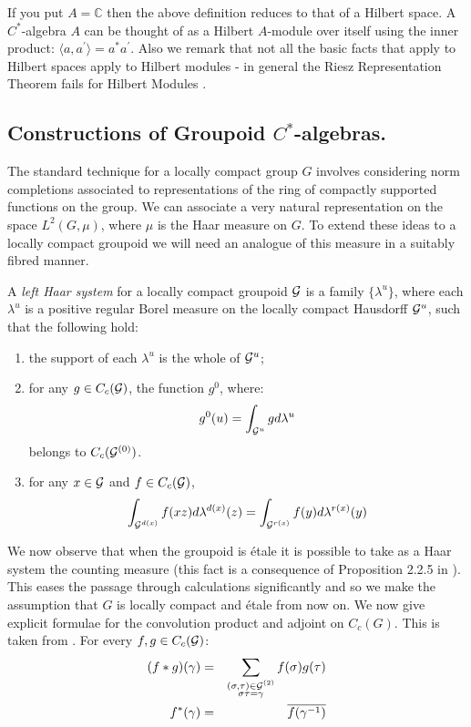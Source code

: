 \begin{remark}
If you put $A= \mathbb{C}$ then the above definition reduces to that of a Hilbert space. A $C^{*}$-algebra $A$ can be thought of as a Hilbert $A$-module over itself using the inner product: $\langle a, a^{'} \rangle = a^{*}a^{'}$. Also we remark that not all the basic facts that apply to Hilbert spaces apply to Hilbert modules - in general the Riesz Representation Theorem fails for Hilbert Modules \cite{MR1077390}.
\end{remark}

\subsection{Constructions of Groupoid \texorpdfstring{$C^{*}$}{C*}-algebras.}\label{Sect:GVC} The standard technique for a locally compact group $G$ involves considering norm completions associated to representations of the ring of compactly supported functions on the group. We can associate a very natural representation on the space $L^{2}(G,\mu)$, where $\mu$ is the Haar measure on $G$. To extend these ideas to a locally compact groupoid we will need an analogue of this measure in a suitably fibred manner.

\begin{definition}
A \textit{left Haar system} for a locally compact groupoid $\mathcal{G}$ is a family $\lbrace \lambda^{u} \rbrace$, where each $\lambda^{u}$ is a positive regular Borel measure on the locally compact Hausdorff $\mathcal{G}^{u}$, such that the following hold:
\begin{enumerate}
\item the support of each $\lambda^{u}$ is the whole of $\mathcal{G}^{u}$;
\item for any $g \in C_{c}(\mathcal{G})$, the function $g^{0}$, where:
\begin{equation*}
g^{0}(u)=\int_{\mathcal{G}^{u}}g d\lambda^{u}
\end{equation*}
belongs to $C_{c}(\mathcal{G}^{(0)})$.
\item for any $x \in \mathcal{G}$ and $f \in C_{c}(\mathcal{G})$,
\begin{equation*}
\int_{\mathcal{G}^{d(x)}}f(xz)d\lambda^{d(x)}(z) = \int_{\mathcal{G}^{r(x)}}f(y)d\lambda^{r(x)}(y)
\end{equation*}
\end{enumerate}
\end{definition}

We now observe that when the groupoid is \'etale it is possible to take as a Haar system the counting measure (this fact is a consequence of Proposition 2.2.5  in \cite{MR1724106}). This eases the passage through calculations significantly and so we make the assumption that $G$ is locally compact and \'etale from now on. We now give explicit formulae for the convolution product and adjoint on $C_{c}(G)$. This is taken from \cite{MR2419901}. For every $f,g \in C_{c}(\mathcal{G})$:
\begin{eqnarray*}
(f \ast g)(\gamma) & = & \sum_{\substack{(\sigma,\tau) \in \mathcal{G}^{(2)}\\ \sigma\tau=\gamma}}f(\sigma)g(\tau)\\
f^{*}(\gamma) & = & \overline{f(\gamma^{-1})} 
\end{eqnarray*}

